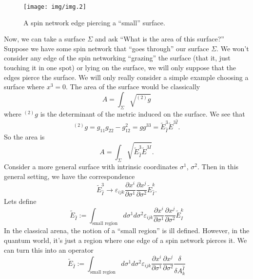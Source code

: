 \begin{figure}[H]
\begin{center}
  \texttt{[image: img/img.2]}
\end{center}
\caption{A spin network edge piercing a ``small'' surface.}\label{fig:img2}
\end{figure}
Now, we can take a surface $\Sigma$ and ask ``What is the area of
this surface?'' Suppose we have some spin network that ``goes
through'' our surface $\Sigma$. We won't consider any edge of the
spin networking ``grazing'' the surface (that it, just touching
it in one spot) or lying on the surface, we will only suppose
that the edges pierce the surface. We will only really consider a
simple example choosing a surface where $x^3=0$. The area of the
surface would be classically 
\begin{equation}
A = \int_{\Sigma}\sqrt{{}^{(2)}g}
\end{equation}
where ${}^{(2)}g$ is the determinant of the metric induced on the
surface. We see that
\begin{equation}
{}^{(2)}g = g_{11}g_{22}-g_{12}^{2} =
gg^{33}=\widetilde{E}^{3}_{\hat{I}}\widetilde{E}^{3\hat{I}}.
\end{equation}
So the area is
\begin{equation}
A = \int_{\Sigma} \sqrt{\widetilde{E}^{3}_{\hat{I}}\widetilde{E}^{3\hat{I}}}.
\end{equation}
Consider a more general surface with intrinsic coordinates
$\sigma^1$, $\sigma^2$. Then in this general setting, we have the
correspondence
\begin{equation}
\widetilde{E}^{3}_{\hat{I}}\to\varepsilon_{ijk}\frac{\partial
  x^{i}}{\partial \sigma^{1}}\frac{\partial x^{j}}{\partial
  \sigma^{2}}\widetilde{E}^{k}_{\hat{I}}.
\end{equation}
Lets define
\begin{equation}
\widetilde{E}_{\hat{I}}:=\int_{\text{small
    region}}d\sigma^{1}d\sigma^{2}\varepsilon_{ijk}\frac{\partial
  x^i}{\partial \sigma^1}\frac{\partial x^j}{\partial
  \sigma^2}\widetilde{E}^{k}_{\hat{I}}
\end{equation}
In the classical arena, the notion of a ``small region'' is ill
defined. However, in the quantum world, it's just a region where
one edge of a spin network pierces it. We can turn this into an
operator
\begin{equation}
\widetilde{E}_{\hat{I}}:=\int_{\text{small
    region}}d\sigma^{1}d\sigma^{2}\varepsilon_{ijk}\frac{\partial
  x^i}{\partial \sigma^1}\frac{\partial x^j}{\partial
  \sigma^2}\frac{\delta}{\delta A^{\hat{I}}_{k}}
\end{equation}
